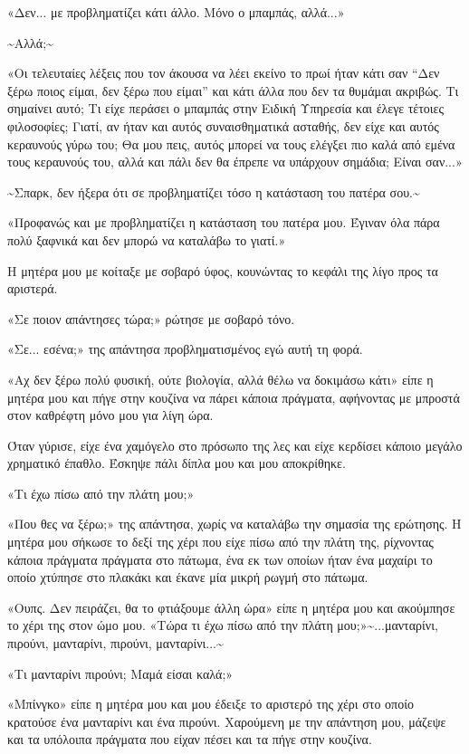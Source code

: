 \documentclass[12pt,twoside, openany]{book}
\begin{document}
«Δεν... με προβληματίζει κάτι άλλο. Μόνο ο μπαμπάς, αλλά...»

\textasciitilde Αλλά;\textasciitilde 

«Οι τελευταίες λέξεις που τον άκουσα να λέει εκείνο το πρωί ήταν κάτι σαν “Δεν ξέρω ποιος είμαι, δεν ξέρω που είμαι” και κάτι άλλα που δεν τα θυμάμαι ακριβώς. Τι σημαίνει αυτό; Τι είχε περάσει ο μπαμπάς στην Ειδική Υπηρεσία και έλεγε τέτοιες φιλοσοφίες; Γιατί, αν ήταν και αυτός συναισθηματικά ασταθής, δεν είχε και αυτός κεραυνούς γύρω του; Θα μου πεις, αυτός μπορεί να τους ελέγξει πιο καλά από εμένα τους κεραυνούς του, αλλά και πάλι δεν θα έπρεπε να υπάρχουν σημάδια; Είναι σαν...»

\textasciitilde Σπαρκ, δεν ήξερα ότι σε προβληματίζει τόσο η κατάσταση του πατέρα σου.\textasciitilde 

«Προφανώς και με προβληματίζει η κατάσταση του πατέρα μου. Έγιναν όλα πάρα πολύ ξαφνικά και δεν μπορώ να καταλάβω το γιατί.»

Η μητέρα μου με κοίταξε με σοβαρό ύφος, κουνώντας το κεφάλι της λίγο προς τα αριστερά. 

«Σε ποιον απάντησες τώρα;» ρώτησε με σοβαρό τόνο.

«Σε... εσένα;» της απάντησα προβληματισμένος εγώ αυτή τη φορά.

«Αχ δεν ξέρω πολύ φυσική, ούτε βιολογία, αλλά θέλω να δοκιμάσω κάτι» είπε η μητέρα μου και πήγε στην κουζίνα να πάρει κάποια πράγματα, αφήνοντας με μπροστά στον καθρέφτη μόνο μου για λίγη ώρα. 

Όταν γύρισε, είχε ένα χαμόγελο στο πρόσωπο της λες και είχε κερδίσει κάποιο μεγάλο χρηματικό έπαθλο. Έσκηψε πάλι δίπλα μου και μου αποκρίθηκε.

«Τι έχω πίσω από την πλάτη μου;»

«Που θες να ξέρω;» της απάντησα, χωρίς να καταλάβω την σημασία της ερώτησης. Η μητέρα μου σήκωσε το δεξί της χέρι που είχε πίσω από την πλάτη της, ρίχνοντας κάποια πράγματα πράγματα στο πάτωμα, ένα εκ των οποίων ήταν ένα μαχαίρι το οποίο χτύπησε στο πλακάκι και έκανε μία μικρή ρωγμή στο πάτωμα.

«Ουπς. Δεν πειράζει, θα το φτιάξουμε άλλη ώρα» είπε η μητέρα μου και ακούμπησε το χέρι της στον ώμο μου. «Τώρα τι έχω πίσω από την πλάτη μου;»\textasciitilde ...μανταρίνι, πιρούνι, μανταρίνι, πιρούνι, μανταρίνι...\textasciitilde 

«Τι μανταρίνι πιρούνι; Μαμά είσαι καλά;»

«Μπίνγκο» είπε η μητέρα μου και μου έδειξε το αριστερό της χέρι στο οποίο κρατούσε ένα μανταρίνι και ένα πιρούνι. Χαρούμενη με την απάντηση μου, μάζεψε και τα υπόλοιπα πράγματα που είχαν πέσει και τα πήγε στην κουζίνα. 
\end{document}
